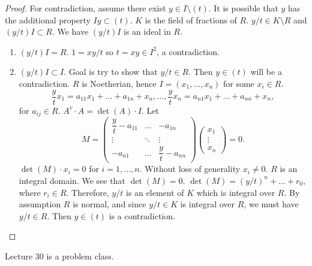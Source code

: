 \documentclass{article}
\newcommand{\rb}[1]{\left( #1 \right)}
\theoremstyle{definition}\newtheorem{definition}{Definition}[section]
\theoremstyle{definition}\newtheorem{remark}[definition]{Remark}
\theoremstyle{definition}\newtheorem*{example}{Example}
\theoremstyle{definition}\newtheorem*{note}{Note}
\begin{document}
\begin{proof}
For contradiction, assume there exist $ y \in I \setminus \rb{t} $. It is possible that $ y $ has the additional property $ Iy \subset \rb{t} $. $ K $ is the field of fractions of $ R $. $ y / t \in K \setminus R $ and $ \rb{y / t}I \subset R $. We have $ \rb{y / t}I $ is an ideal in $ R $.
\begin{enumerate}
\item $ \rb{y / t}I = R $. $ 1 = xy / t $ so $ t = xy \in I^2 $, a contradiction.
\item $ \rb{y / t}I \subset I $. Goal is try to show that $ y / t \in R $. Then $ y \in \rb{t} $ will be a contradiction. $ R $ is Noetherian, hence $ I = \rb{x_1, \dots, x_n} $ for some $ x_i \in R $.
$$ \dfrac{y}{t}x_1 = a_{11}x_1 + \dots + a_{1n} + x_n, \dots, \dfrac{y}{t}x_n = a_{n1}x_1 + \dots + a_{nn} + x_n, $$
for $ a_{ij} \in R $. $ A^v \cdot A = \det\rb{A} \cdot I $. Let
$$ M = \begin{pmatrix}
\dfrac{y}{t} - a_{11} & \dots & -a_{1n} \\
\vdots & \ddots & \vdots \\
-a_{n1} & \dots & \dfrac{y}{t} - a_{nn}
\end{pmatrix}\begin{pmatrix}
x_1 \\
\vdots \\
x_n
\end{pmatrix} = 0. $$
$ \det\rb{M} \cdot x_i = 0 $ for $ i = 1, \dots, n $. Without loss of generality $ x_i \ne 0 $. $ R $ is an integral domain. We see that $ \det\rb{M} = 0 $. $ \det\rb{M} = \rb{y / t}^n + \dots + r_0 $, where $ r_i \in R $. Therefore, $ y / t $ is an element of $ K $ which is integral over $ R $. By assumption $ R $ is normal, and since $ y / t \in K $ is integral over $ R $, we must have $ y / t \in R $. Then $ y \in \rb{t} $ is a contradiction.
\end{enumerate}
\end{proof}


Lecture 30 is a problem class.
\end{document}
